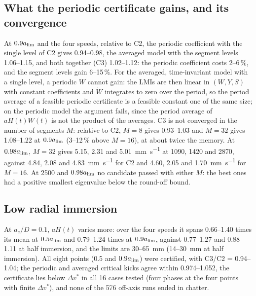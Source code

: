 \subsection{What the periodic certificate gains, and its convergence}\label{supp:cert-decomp}

At $0.9a_{\lim}$ and the four speeds, relative to C2, the periodic coefficient with the single level of C2 gives 0.94--0.98, the averaged model with the segment levels 1.06--1.15, and both together (C3) 1.02--1.12: the periodic coefficient costs 2--6\,\%, and the segment levels gain 6--15\,\%. For the averaged, time-invariant model with a single level, a periodic $W$ cannot gain: the LMIs are then linear in $(W,Y,S)$ with constant coefficients and $\dot W$ integrates to zero over the period, so the period average of a feasible periodic certificate is a feasible constant one of the same size; on the periodic model the argument fails, since the period average of $aH(t)W(t)$ is not the product of the averages. C3 is not converged in the number of segments $M$: relative to C2, $M=8$ gives 0.93--1.03 and $M=32$ gives 1.08--1.22 at $0.9a_{\lim}$ (3--12\,\% above $M=16$), at about twice the memory. At $0.98a_{\lim}$, $M=32$ gives 5.15, 2.31 and \SI{5.01}{\milli\metre\per\second} at 1090, 1420 and \SI{2870}{\rpm}, against 4.84, 2.08 and \SI{4.83}{\milli\metre\per\second} for C2 and 4.60, 2.05 and \SI{1.70}{\milli\metre\per\second} for $M=16$. At \SI{2500}{\rpm} and $0.98a_{\lim}$ no candidate passed with either $M$: the best ones had a positive smallest eigenvalue below the round-off bound.

\subsection{Low radial immersion}\label{supp:cert-lowimm}

At $a_e/D=0.1$, $aH(t)$ varies more: over the four speeds it spans 0.66--1.40 times its mean at $0.5a_{\lim}$ and 0.79--1.24 times at $0.9a_{\lim}$, against 0.77--1.27 and 0.88--1.11 at half immersion, and the limits are 30--\SI{65}{\milli\metre} (14--\SI{30}{\milli\metre} at half immersion). All eight points (0.5 and $0.9a_{\lim}$) were certified, with C3/C2 = 0.94--1.04; the periodic and averaged critical kicks agree within 0.974--1.052, the certificate lies below $\Delta v^*$ in all 16 cases tested (four phases at the four points with finite $\Delta v^*$), and none of the 576 off-axis runs ended in chatter.

